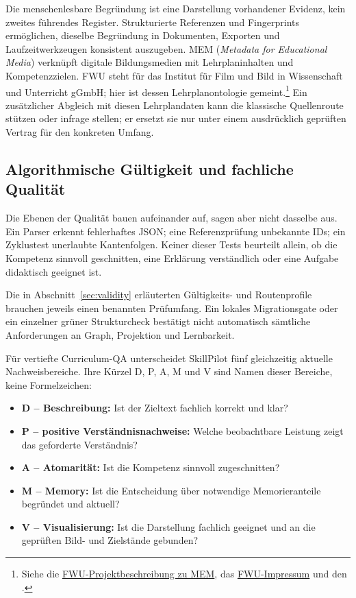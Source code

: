 Die menschenlesbare Begründung ist eine Darstellung vorhandener
Evidenz, kein zweites führendes Register. Strukturierte Referenzen
und Fingerprints ermöglichen, dieselbe Begründung in Dokumenten,
Exporten und Laufzeitwerkzeugen konsistent auszugeben. MEM
(\emph{Metadata for Educational Media}) verknüpft digitale Bildungsmedien
mit Lehrplaninhalten und Kompetenzzielen. FWU steht für das Institut für
Film und Bild in Wissenschaft und Unterricht gGmbH; hier ist dessen
Lehrplanontologie gemeint.\footnote{Siehe die
\href{https://fwu.de/bildung-der-zukunft/}{FWU-Projektbeschreibung zu MEM},
das \href{https://fwu.de/impressum-datenschutzerklaerung/}{FWU-Impressum}
und den .}
Ein zusätzlicher Abgleich mit diesen Lehrplandaten kann die klassische Quellenroute
stützen oder infrage stellen; er ersetzt sie nur unter einem
ausdrücklich geprüften Vertrag für den konkreten Umfang.

\subsection{Algorithmische Gültigkeit und fachliche Qualität}

Die Ebenen der Qualität bauen aufeinander auf, sagen aber nicht
dasselbe aus. Ein Parser erkennt fehlerhaftes JSON; eine
Referenzprüfung unbekannte IDs; ein Zyklustest unerlaubte
Kantenfolgen. Keiner dieser Tests beurteilt allein, ob die
Kompetenz sinnvoll geschnitten, eine Erklärung verständlich
oder eine Aufgabe didaktisch geeignet ist.

Die in Abschnitt~\ref{sec:validity} erläuterten
Gültigkeits- und Routenprofile brauchen jeweils einen benannten
Prüfumfang. Ein lokales Migrationsgate oder ein einzelner
grüner Strukturcheck bestätigt nicht automatisch sämtliche
Anforderungen an Graph, Projektion und Lernbarkeit.

Für vertiefte Curriculum-QA unterscheidet SkillPilot fünf
gleichzeitig aktuelle Nachweisbereiche. Ihre Kürzel D, P, A, M und V
sind Namen dieser Bereiche, keine Formelzeichen:
\begin{itemize}
\item \textbf{D -- Beschreibung:} Ist der Zieltext fachlich korrekt und klar?
\item \textbf{P -- positive Verständnisnachweise:} Welche beobachtbare
Leistung zeigt das geforderte Verständnis?
\item \textbf{A -- Atomarität:} Ist die Kompetenz sinnvoll zugeschnitten?
\item \textbf{M -- Memory:} Ist die Entscheidung über notwendige
Memorieranteile begründet und aktuell?
\item \textbf{V -- Visualisierung:} Ist die Darstellung fachlich geeignet
und an die geprüften Bild- und Zielstände gebunden?
\end{itemize}

